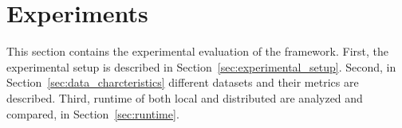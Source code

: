\chapter{Experiments}

This section contains the experimental evaluation of the framework.
First, the experimental setup is described in Section~\ref{sec:experimental_setup}.
Second, in Section~\ref{sec:data_charcteristics} different datasets and their metrics are described.
Third, runtime of both local and distributed are analyzed and compared, in Section~\ref{sec:runtime}.



% 
